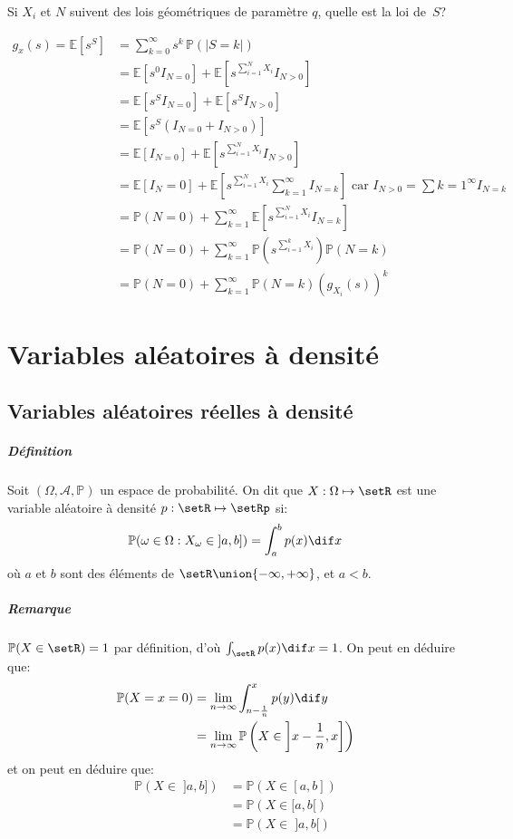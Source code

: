 \documentclass[a4paper,10pt,french,openany]{memoir}
\newcommand{\Proba}{\mathbb{P}}
\newcommand{\Esper}{\mathbb{E}}
\newcommand{\tribu}[1]{\mathcal{#1}}
\newcommand{\abs}[1]{\lvert #1 \rvert}
\begin{document}
Si $X_i$ et $N$ suivent des lois géométriques de paramètre $q$, quelle est la loi de~$S$?

\begin{align*}
 g_x(s) = \Esper\left[s^S\right] &= \sum_{k=0}^\infty s^k\,\Proba\left(\abs{S=k}\right) \\
 &= \Esper\left[s^0 I_{N=0}\right] + \Esper\left[s^{\sum_{i=1}^N X_i} I_{N>0}\right] \\
 &= \Esper\left[s^S I_{N=0}\right] + \Esper\left[s^S I_{N>0}\right] \\
 &= \Esper\left[s^S (I_{N=0} + I_{N>0})\right] \\
 &= \Esper[I_{N=0}] + \Esper\left[s^{\sum_{i=1}^N X_i} I_{N>0}\right] \\
 &= \Esper[I_N=0] + \Esper\left[s^{\sum_{i=1}^N X_i} \sum_{k=1}^\infty I_{N=k}\right] \text{ car } I_{N>0}=\sum{k=1}^\infty I_{N=k} \\
 &= \Proba(N=0) + \sum_{k=1}^\infty \Esper\left[s^{\sum_{i=1}^N X_i} I_{N=k}\right] \\
 &= \Proba(N=0) + \sum_{k=1}^\infty \Proba\left(s^{\sum_{i=1}^k X_i}\right) \Proba(N=k) \\
 &= \Proba(N=0) + \sum_{k=1}^\infty \Proba(N=k) (g_{X_i} (s))^k
\end{align*}

\chapter{Variables aléatoires à densité}

\section{Variables aléatoires réelles à densité}

\paragraph{Définition}
Soit $(\Omega, \tribu A, \Proba)$ un espace de probabilité. On dit que $X:\Omega\mapsto\setR$ est une variable aléatoire à densité $p:\setR\mapsto\setRp$ si:
\[\Proba(\omega\in\Omega: X_\omega \in \;]a,b])=\int_a^b p(x) \dif x\]
où $a$ et $b$ sont des éléments de $\setR\union\lbrace-\infty,+\infty\rbrace$, et $a<b$.

\paragraph{Remarque}
$\Proba(X\in\setR)=1$ par définition, d'où $\int_{\setR} p(x) \dif x = 1$. On peut en déduire que:
\begin{align*}
    \Proba(X=x=0) &= \lim_{n\to\infty} \int_{n-\frac1n}^x p(y) \dif y \\
    &= \lim_{n\to\infty} \Proba\left(X\in\left]x-\frac1n,x\right]\right)
\end{align*}
et on peut en déduire que:
\begin{align*}
    \Proba(X\in\;]a,b]) &= \Proba(X\in[a,b]) \\
    &= \Proba(X\in[a,b[) \\
    &= \Proba(X\in\;]a,b[)
\end{align*}
\end{document}
